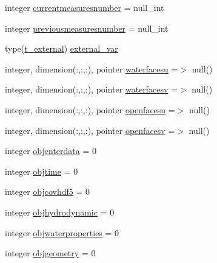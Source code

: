 \begin{DoxyCompactItemize}
integer \mbox{\hyperlink{structmodulesequentialassimilation_1_1t__sequentialassimilation_a043d6d4f7cef3964e1bd3ebdfeac5a25}{currentmeasuresnumber}} = null\+\_\+int
\item 
integer \mbox{\hyperlink{structmodulesequentialassimilation_1_1t__sequentialassimilation_aba7a1438edc5f27d8b3e00a26372a840}{previousmeasuresnumber}} = null\+\_\+int
\item 
type(\mbox{\hyperlink{structmodulesequentialassimilation_1_1t__external}{t\+\_\+external}}) \mbox{\hyperlink{structmodulesequentialassimilation_1_1t__sequentialassimilation_aa41f1784a41941632f7c8e9849a676c2}{external\+\_\+var}}
\item 
integer, dimension(\+:,\+:,\+:), pointer \mbox{\hyperlink{structmodulesequentialassimilation_1_1t__sequentialassimilation_a1dadee004028a21cff7bd4423fdc6199}{waterfacesu}} =$>$ null()
\item 
integer, dimension(\+:,\+:,\+:), pointer \mbox{\hyperlink{structmodulesequentialassimilation_1_1t__sequentialassimilation_a7b78e3baf5f95c031dee33c6a2ee121c}{waterfacesv}} =$>$ null()
\item 
integer, dimension(\+:,\+:,\+:), pointer \mbox{\hyperlink{structmodulesequentialassimilation_1_1t__sequentialassimilation_ab574c619925271a2c39e7d220848f319}{openfacesu}} =$>$ null()
\item 
integer, dimension(\+:,\+:,\+:), pointer \mbox{\hyperlink{structmodulesequentialassimilation_1_1t__sequentialassimilation_a0e81dc1a936c9a43c6eaf1578b8faffa}{openfacesv}} =$>$ null()
\item 
integer \mbox{\hyperlink{structmodulesequentialassimilation_1_1t__sequentialassimilation_acd2b9bbfbbd41196d3490876473fe25d}{objenterdata}} = 0
\item 
integer \mbox{\hyperlink{structmodulesequentialassimilation_1_1t__sequentialassimilation_a151b4fde23165bd1c1150c526e189a8e}{objtime}} = 0
\item 
integer \mbox{\hyperlink{structmodulesequentialassimilation_1_1t__sequentialassimilation_a13e5d2c726e3e0b301730edf5d7e5956}{objcovhdf5}} = 0
\item 
integer \mbox{\hyperlink{structmodulesequentialassimilation_1_1t__sequentialassimilation_a4b69a8596da113a4397c496583803563}{objhydrodynamic}} = 0
\item 
integer \mbox{\hyperlink{structmodulesequentialassimilation_1_1t__sequentialassimilation_afd8372369a629b3a0b233c32e2efe33e}{objwaterproperties}} = 0
\item 
integer \mbox{\hyperlink{structmodulesequentialassimilation_1_1t__sequentialassimilation_a8840dc3ce26202a58279068812eebc48}{objgeometry}} = 0

\end{DoxyCompactItemize}
